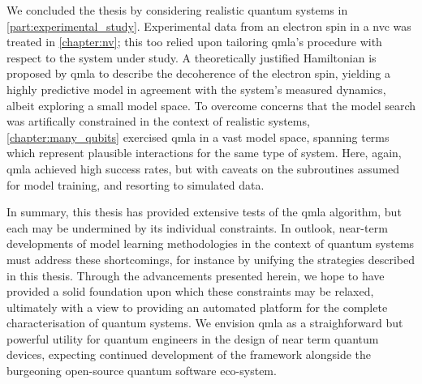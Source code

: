 We concluded the thesis by considering realistic quantum systems in \cref{part:experimental_study}. 
Experimental data from an electron spin in a \gls{nvc} was treated in \cref{chapter:nv};
    this too relied upon tailoring \gls{qmla}'s procedure with respect to the system under study.
A theoretically justified Hamiltonian is proposed by \gls{qmla} to describe the decoherence of the electron spin, 
    yielding a highly predictive model in agreement with the system's measured dynamics, 
    albeit exploring a small model space. 
To overcome concerns that the model search was artifically constrained in the context of realistic systems, 
    \cref{chapter:many_qubits} exercised \gls{qmla} in a vast model space, 
    spanning terms which represent plausible interactions for the same type of system. 
Here, again, \gls{qmla} achieved high success rates, but with caveats on the subroutines assumed for model training, 
    and resorting to simulated data. 
\par

In summary, this thesis has provided extensive tests of the \gls{qmla} algorithm, 
    but each may be undermined by its individual constraints. 
In outlook, near-term developments of model learning methodologies in the context of quantum systems
    must address these shortcomings, for instance by unifying the strategies described in this thesis. 
Through the advancements presented herein, we hope to have provided a solid foundation upon which these constraints may be relaxed, 
    ultimately with a view to providing an automated platform for the complete characterisation of quantum systems.
We envision \gls{qmla} as a straighforward but powerful utility for quantum engineers in the design of near term quantum devices, 
    expecting continued development of the framework alongside the burgeoning open-source quantum software eco-system. 
\par



